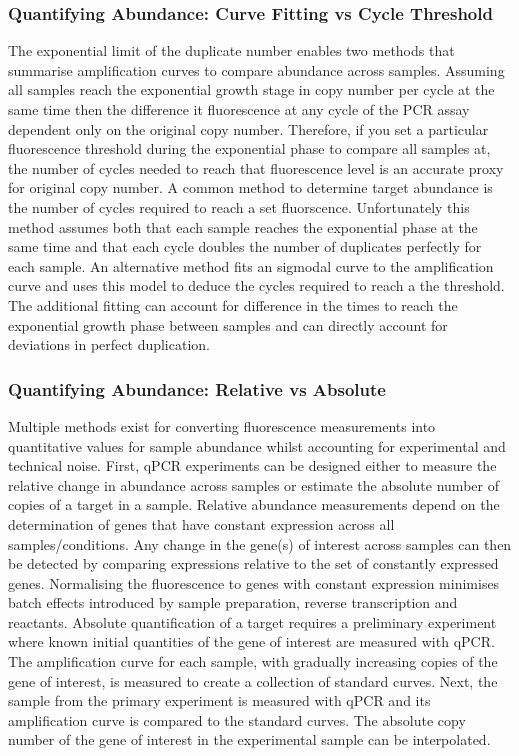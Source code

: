 \documentclass{SBCbookchapter}
\begin{document}
\subsubsection{Quantifying Abundance: Curve Fitting vs Cycle Threshold}

The exponential limit of the duplicate number enables two methods that summarise amplification curves to compare abundance across samples. Assuming all samples reach the exponential growth stage in copy number per cycle at the same time then the difference it fluorescence at any cycle of the PCR assay dependent only on the original copy number. Therefore, if you set a particular fluorescence threshold during the exponential phase to compare all samples at, the number of cycles needed to reach that fluorescence level is an accurate proxy for original copy number. A common method to determine target abundance is the number of cycles required to reach a set fluorscence. Unfortunately this method assumes both that each sample reaches the exponential phase at the same time and that each cycle doubles the number of duplicates perfectly for each sample. An alternative method fits an sigmodal curve to the amplification curve and uses this model to deduce the cycles required to reach a the threshold. The additional fitting can account for difference in the times to reach the exponential growth phase between samples and can directly account for deviations in perfect duplication. 

\subsubsection{Quantifying Abundance: Relative vs Absolute}

Multiple methods exist for converting fluorescence measurements into quantitative values for sample abundance whilst accounting for experimental and technical noise. First, qPCR experiments can be designed either to measure the relative change in abundance across samples or estimate the absolute number of copies of a target in a sample. Relative abundance measurements depend on the determination of genes that have constant expression across all samples/conditions. Any change in the gene(s) of interest across samples can then be detected by comparing expressions relative to the set of constantly expressed genes. Normalising the fluorescence to genes with constant expression minimises batch effects introduced by sample preparation, reverse transcription and reactants. Absolute quantification of a target requires a preliminary experiment where known initial quantities of the gene of interest are measured with qPCR. The amplification curve for each sample, with gradually increasing copies of the gene of interest, is measured to create a collection of standard curves. Next, the sample from the primary experiment is measured with qPCR and its amplification curve is compared to the standard curves. The absolute copy number of the gene of interest in the experimental sample can be interpolated.
\end{document}
